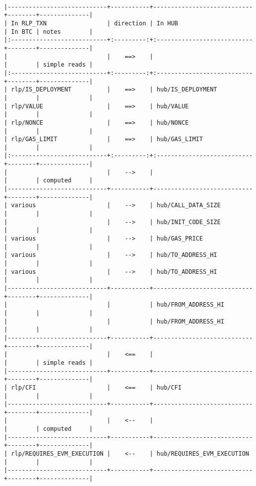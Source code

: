 \documentclass[varwidth=\maxdimen,margin=0.5cm,multi={verbatim}]{standalone}
\begin{document}
\begin{verbatim}

|----------------------------+-----------+----------------------------+--------+--------------|
| In RLP_TXN                 | direction | In HUB                     | In BTC | notes        |
|:---------------------------+:---------:+:---------------------------+--------+--------------|
|                            |    ==>    |                            |        | simple reads |
|:---------------------------+:---------:+:---------------------------+--------+--------------|
| rlp/IS_DEPLOYMENT          |    ==>    | hub/IS_DEPLOYMENT          |        |              |
| rlp/VALUE                  |    ==>    | hub/VALUE                  |        |              |
| rlp/NONCE                  |    ==>    | hub/NONCE                  |        |              |
| rlp/GAS_LIMIT              |    ==>    | hub/GAS_LIMIT              |        |              |
|:---------------------------+:---------:+:---------------------------+--------+--------------|
|                            |    -->    |                            |        | computed     |
|----------------------------+-----------+----------------------------+--------+--------------|
| various                    |    -->    | hub/CALL_DATA_SIZE         |        |              |
|                            |    -->    | hub/INIT_CODE_SIZE         |        |              |
| various                    |    -->    | hub/GAS_PRICE              |        |              |
| various                    |    -->    | hub/TO_ADDRESS_HI          |        |              |
| various                    |    -->    | hub/TO_ADDRESS_HI          |        |              |
|----------------------------+-----------+----------------------------+--------+--------------|
|                            |           | hub/FROM_ADDRESS_HI        |        |              |
|                            |           | hub/FROM_ADDRESS_HI        |        |              |
|----------------------------+-----------+----------------------------+--------+--------------|
|                            |    <==    |                            |        | simple reads |
|----------------------------+-----------+----------------------------+--------+--------------|
| rlp/CFI                    |    <==    | hub/CFI                    |        |              |
|----------------------------+-----------+----------------------------+--------+--------------|
|                            |    <--    |                            |        | computed     |
|----------------------------+-----------+----------------------------+--------+--------------|
| rlp/REQUIRES_EVM_EXECUTION |    <--    | hub/REQUIRES_EVM_EXECUTION |        |              |
|----------------------------+-----------+----------------------------+--------+--------------|

\end{verbatim}
\end{document}
